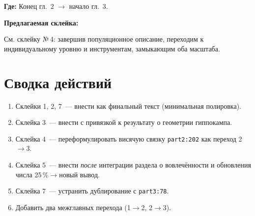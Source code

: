 \documentclass[12pt,a4paper]{article}
\newenvironment{glue}{%
  \begin{mdframed}[backgroundcolor=green!5, linecolor=green!40!black, linewidth=0.6pt,
    innertopmargin=5pt, innerbottommargin=5pt]
  \textbf{Предлагаемая склейка:}\par\smallskip}{%
  \end{mdframed}}
\newcommand{\loc}[1]{\par\noindent\textcolor{blue!55!black}{\textbf{Где:} #1}\par}
\begin{document}
\loc{Конец гл.~2 $\to$ начало гл.~3.}
\begin{glue}
См. склейку №\,4: завершив популяционное описание, переходим к индивидуальному
уровню и инструментам, замыкающим оба масштаба.
\end{glue}

\section*{Сводка действий}
\begin{enumerate}[nosep]
  \item Склейки 1, 2, 7~--- внести как финальный текст (минимальная полировка).
  \item Склейка 3~--- внести с привязкой к результату о геометрии гиппокампа.
  \item Склейка 4~--- переформулировать висячую связку \texttt{part2:202} как
        переход 2$\to$3.
  \item Склейка 5~--- внести \emph{после} интеграции раздела о вовлечённости и
        обновления числа 25\,\%$\to$новый вывод.
  \item Склейка 7~--- устранить дублирование с \texttt{part3:78}.
  \item Добавить два межглавных перехода (1$\to$2, 2$\to$3).
\end{enumerate}
\end{document}
